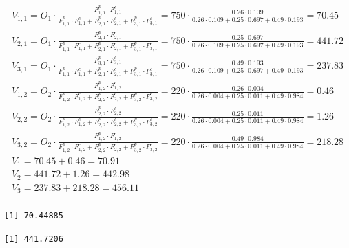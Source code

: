 \documentclass[]{elsarticle} %
\begin{document}
\begin{equation}
\label{eq:SA-2populations}
\begin{array}{l}

V_{1,1} = O_1\cdot \frac{F^p_{1,1} \cdot F^c_{1,1}}{F^p_{1,1} \cdot F^c_{1,1} + F^p_{2,1} \cdot F^c_{2,1} + F^p_{3,1} \cdot F^c_{3,1}} = 
750 \cdot \frac{0.26 \cdot 0.109}{0.26 \cdot 0.109 + 0.25 \cdot 0.697 + 0.49 \cdot 0.193} = 70.45\\
V_{2,1} = O_1\cdot \frac{F^p_{2,1} \cdot F^c_{2,1}}{F^p_{1,1} \cdot F^c_{1,1} + F^p_{2,1} \cdot F^c_{2,1} + F^p_{3,1} \cdot F^c_{3,1}} = 
750 \cdot \frac{0.25 \cdot 0.697}{0.26 \cdot 0.109 + 0.25 \cdot 0.697 + 0.49 \cdot 0.193} = 441.72\\
V_{3,1} = O_1\cdot \frac{F^p_{3,1} \cdot F^c_{3,1}}{F^p_{1,1} \cdot F^c_{1,1} + F^p_{2,1} \cdot F^c_{2,1} + F^p_{3,1} \cdot F^c_{3,1}} = 
750 \cdot \frac{0.49 \cdot 0.193}{0.26 \cdot 0.109 + 0.25 \cdot 0.697 + 0.49 \cdot 0.193} = 237.83\\

V_{1,2} = O_2\cdot \frac{F^p_{1,2} \cdot F^c_{1,2}}{F^p_{1,2} \cdot F^c_{1,2} + F^p_{2,2} \cdot F^c_{2,2} + F^p_{3,2} \cdot F^c_{3,2}} = 
220 \cdot \frac{0.26 \cdot 0.004}{0.26 \cdot 0.004 + 0.25 \cdot 0.011 + 0.49 \cdot 0.984} = 0.46\\
V_{2,2} = O_2\cdot \frac{F^p_{2,2} \cdot F^c_{2,2}}{F^p_{1,2} \cdot F^c_{1,2} + F^p_{2,2} \cdot F^c_{2,2} + F^p_{3,2} \cdot F^c_{3,2}} = 
220 \cdot \frac{0.25 \cdot 0.011}{0.26 \cdot 0.004 + 0.25 \cdot 0.011 + 0.49 \cdot 0.984} = 1.26\\
V_{3,2} = O_2\cdot \frac{F^p_{1,2} \cdot F^c_{1,2}}{F^p_{1,2} \cdot F^c_{1,2} + F^p_{2,2} \cdot F^c_{2,2} + F^p_{3,2} \cdot F^c_{3,2}} = 
220 \cdot \frac{0.49 \cdot 0.984}{0.26 \cdot 0.004 + 0.25 \cdot 0.011 + 0.49 \cdot 0.984} = 218.28\\

V_{1} = 70.45 + 0.46 = 70.91\\
V_{2} = 441.72 + 1.26 = 442.98\\
V_{3} = 237.83 + 218.28 = 456.11\\
\end{array}
\end{equation}

\begin{verbatim}
[1] 70.44885
\end{verbatim}

\begin{verbatim}
[1] 441.7206
\end{verbatim}
\end{document}
